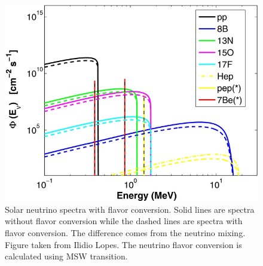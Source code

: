 \documentclass[%
 aip,
 jmp,%
 amsmath,amssymb,
 reprint,%
]{revtex4-1}
\begin{document}



\begin{figure}[!hbtp]
\centering
\includegraphics[width=\columnwidth]{assets/solar_neutrino_spectra_flavor_conversion.jpg}
\caption{Solar neutrino spectra with flavor conversion. Solid lines are spectra without flavor conversion while the dashed lines are spectra with flavor conversion. The difference comes from the neutrino mixing. Figure taken from Ilidio Lopes.\cite{Lopes2013,Lopes2013a} The neutrino flavor conversion is calculated using MSW transition.}
\label{fig:solar_neutrino_spectra_flavor_conversion}
\end{figure}
\end{document}
